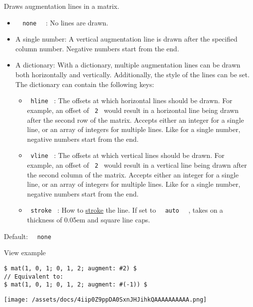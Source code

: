 Draws augmentation lines in a matrix.

\begin{itemize}
\tightlist
\item
  \texttt{\ }{\texttt{\ none\ }}\texttt{\ } : No lines are drawn.
\item
  A single number: A vertical augmentation line is drawn after the
  specified column number. Negative numbers start from the end.
\item
  A dictionary: With a dictionary, multiple augmentation lines can be
  drawn both horizontally and vertically. Additionally, the style of the
  lines can be set. The dictionary can contain the following keys:

  \begin{itemize}
  \tightlist
  \item
    \texttt{\ hline\ } : The offsets at which horizontal lines should be
    drawn. For example, an offset of \texttt{\ 2\ } would result in a
    horizontal line being drawn after the second row of the matrix.
    Accepts either an integer for a single line, or an array of integers
    for multiple lines. Like for a single number, negative numbers start
    from the end.
  \item
    \texttt{\ vline\ } : The offsets at which vertical lines should be
    drawn. For example, an offset of \texttt{\ 2\ } would result in a
    vertical line being drawn after the second column of the matrix.
    Accepts either an integer for a single line, or an array of integers
    for multiple lines. Like for a single number, negative numbers start
    from the end.
  \item
    \texttt{\ stroke\ } : How to
    \href{/docs/reference/visualize/stroke/}{stroke} the line. If set to
    \texttt{\ }{\texttt{\ auto\ }}\texttt{\ } , takes on a thickness of
    0.05em and square line caps.
  \end{itemize}
\end{itemize}

Default: \texttt{\ }{\texttt{\ none\ }}\texttt{\ }


View example

\begin{verbatim}
$ mat(1, 0, 1; 0, 1, 2; augment: #2) $
// Equivalent to:
$ mat(1, 0, 1; 0, 1, 2; augment: #(-1)) $
\end{verbatim}

\texttt{[image: /assets/docs/4iip0Z9ppDA0SxnJHJihkQAAAAAAAAAA.png]}

